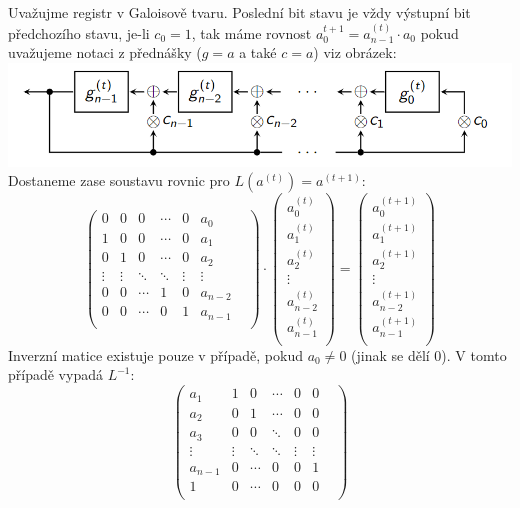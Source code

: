 \documentclass[12pt, a4paper]{article}
\begin{document}
\section{}
Uvažujme registr v Galoisově tvaru. Poslední bit stavu je vždy výstupní bit předchozího stavu, je-li $c_0 = 1$, tak máme rovnost $a_0^{t+1} = a_{n-1}^{(t)} \cdot a_0$ pokud uvažujeme notaci z přednášky ($g = a$ a také $c = a$) viz obrázek:
\includegraphics[width=\textwidth]{schema.png}
Dostaneme zase soustavu rovnic pro $L(a^{(t)}) = a^{(t+1)}$:
$$
\begin{pmatrix}
0 & 0 & 0 & \cdots & 0 & a_0\\
1 & 0 & 0 & \cdots & 0 & a_1\\
0 & 1 & 0 & \cdots & 0 & a_2 &\\
\vdots & \vdots & \ddots & \ddots & \vdots & \vdots \\
0 & 0 & \cdots & 1 & 0 & a_{n-2}\\
0 & 0 & \cdots & 0 & 1 & a_{n-1}\\
\end{pmatrix}
\cdot
\begin{pmatrix}
a_0^{(t)}\\
a_1^{(t)}\\
a_2^{(t)}\\
\vdots\\
a_{n-2}^{(t)}\\
a_{n-1}^{(t)}\\
\end{pmatrix}
=
\begin{pmatrix}
a_0^{(t+1)}\\
a_1^{(t+1)}\\
a_2^{(t+1)}\\
\vdots\\
a_{n-2}^{(t+1)}\\
a_{n-1}^{(t+1)}\\
\end{pmatrix}
$$
Inverzní matice existuje pouze v případě, pokud $a_0 \neq 0$ (jinak se dělí 0). V tomto případě vypadá $L^{-1}:$
$$
\begin{pmatrix}
a_1 & 1 & 0 & \cdots & 0 & 0\\
a_2 & 0 & 1 & \cdots & 0 & 0\\
a_3 & 0 & 0 & \ddots & 0 & 0 &\\
\vdots & \vdots & \ddots & \ddots & \vdots & \vdots \\
a_{n-1} & 0 & \cdots & 0 & 0 & 1\\
1 & 0 & \cdots & 0 & 0 & 0\\
\end{pmatrix}
$$

\section{}
\end{document}
